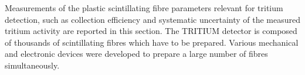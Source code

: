 Measurements of the plastic scintillating fibre parameters relevant for tritium detection, such as collection efficiency and systematic uncertainty of the measured tritium activity are reported in this section. The TRITIUM detector is composed of thousands of scintillating fibres which have to be prepared. Various mechanical and electronic devices were developed to prepare a large number of fibres simultaneously.